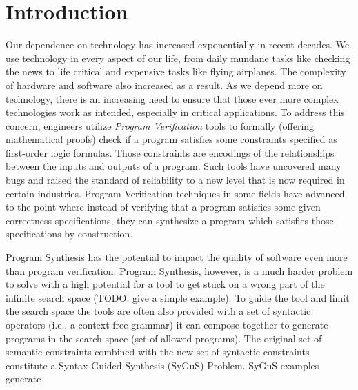 \section{Introduction}
\label{sec:introduction}
Our dependence on technology has increased exponentially in recent decades.
%
We use technology in every aspect of our life, from daily mundane tasks like checking the news to life critical and expensive tasks like flying airplanes.
%
The complexity of hardware and software also increased as a result.
%
As we depend more on technology, there is an increasing need to ensure that those ever more complex technologies work as intended, especially in critical applications.
%
To address this concern, engineers utilize \emph{Program Verification} tools
%
to formally (offering mathematical proofs) check if a program satisfies some constraints specified as first-order logic formulas.
%
Those constraints are encodings of the relationships between the inputs and outputs of a program.
%
Such tools have uncovered many bugs and raised the standard of reliability to a new level that is now required in certain industries.
%
Program Verification techniques in some fields have advanced to the point where instead of verifying that a program satisfies some given correctness specifications, 
%
they can synthesize a program which satisfies those specifications by construction.

Program Synthesis has the potential to impact the quality of software even more than program verification.
%
Program Synthesis, however, is a much harder problem to solve with a high potential for a tool to get stuck on a wrong part of the infinite search space (TODO: give a simple example).
%
To guide the tool and limit the search space the tools are often also provided with a set of syntactic operators (i.e., a context-free grammar) it can compose together to generate programs in the search space (set of allowed programs).
%
The original set of semantic constraints combined with the new set of syntactic constraints constitute a Syntax-Guided Synthesis (SyGuS) Problem.
%
SyGuS examples generate 
